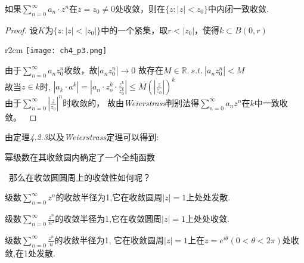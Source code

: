 \begin{mypro}
    如果$\displaystyle{\sum\limits_{n=0}^\infty a_n\cdot z^n}$在$z=z_0\neq0$处收敛，则在$\{z:|z|<z_0\}$中内闭一致收敛.
\end{mypro}
\begin{proof}
	设$K$为$\{z:|z|<|z_0|\}$中的一个紧集，取$r<|z_0|$，使得$k\subset B(0,r)$
\begin{wrapfigure}[4]{r}{2cm}
    \centering
    \texttt{[image: ch4\_p3.png]}
\end{wrapfigure}
由于$\displaystyle{\sum\limits_{n=0}^\infty a_nz_0^n}$收敛，故$\left|a_nz_0^n\right|\rightarrow0$
故存在$M\in\mathbb{R}.\ s.t.\ \left|a_nz_0^n\right|<M$\\
故当$z\in k$时,
$\displaystyle{\left|a_k\cdot a^k\right|=\left|a_n\cdot z_o^k\cdot \frac{z^k}{z_0^k}\right|\leqslant M\left(\left|\frac{z}{z_0}\right|\right)^k}$\\
由于$\displaystyle{\sum\limits_{n=0}^\infty\left|\frac{z}{z_0}\right|^n}$时收敛的，
故由\emph{Weierstrass}判别法得$\displaystyle{\sum\limits_{n=0}^\infty a_nz^n}$在$k$中一致收敛。\
\end{proof}

\noindent 由定理\emph{4.2.3}以及\emph{Weierstrass}定理可以得到:

\begin{mypro}
    幂级数在其收敛圆内确定了一个全纯函数\par
    \qquad\quad\, 那么在收敛圆圆周上的收敛性如何呢？
\end{mypro}

\begin{eg}
    级数$\displaystyle{\sum\limits_{n=0}^\infty z^n}$的收敛半径为1,它在收敛圆周$|z|=1$上处处发散.
\end{eg}

\begin{eg}
    级数$\displaystyle{\sum\limits_{n=0}^\infty \frac{z^n}{n^2}}$的收敛半径为1,它在收敛圆周$|z|=1$上处处收敛.
\end{eg}

\begin{eg}
    级数$\displaystyle{\sum\limits_{n=0}^\infty \frac{z^n}{n}}$的收敛半径为1,
    它在收敛圆周$|z|=1$上在$z=e^{i\theta}(0<\theta<2\pi)$处收敛,在1处发散.
\end{eg}

